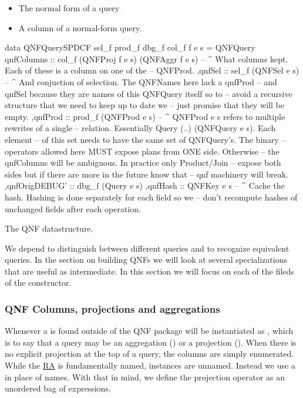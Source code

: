 \begin{itemize}
\item The normal form of a query
\item A column of a normal-form query.
\end{itemize}

\begin{code}
  \begin{haskellcode}
    data QNFQuerySPDCF sel_f prod_f dbg_f col_f f e s =
      QNFQuery
      { qnfColumns :: col_f (QNFProj f e s) (QNFAggr f e s)
        -- ^ What columns kept. Each of these is a column on one of the
        -- QNFProd.
        ,qnfSel :: sel_f (QNFSel e s)
        -- ^ And conjuction of selection. The QNFNames here lack a qnfProd
        -- and qnfSel because they are names of this QNFQuery itself so to
        -- avoid a recursive structure that we need to keep up to date we
        -- just promise that they will be empty.
        ,qnfProd :: prod_f (QNFProd e s)
        -- ^ QNFProd e s refers to multiple rewrites of a single
        -- relation. Essentially {Query (..) (QNFQuery e s)}. Each element
        -- of this set needs to have the same set of QNFQuery's. The binary
        -- operators allowed here MUST expose plans from ONE side. Otherwise
        -- the qnfColumns will be ambiguous. In practice only Product/Join
        -- expose both sides but if there are more in the future know that
        -- qnf machinery will break.
        ,qnfOrigDEBUG' :: dbg_f (Query e s)
        ,qnfHash :: QNFKey e s
        -- ^ Cache the hash. Hashing is done separately for each field so we
        -- don't recompute hashes of unchanged fields after each operation.
      }
  \end{haskellcode}
  \label{lst:qnf_struct}
  \caption{The QNF datastructure.}
\end{code}

We depend to distinguish between different queries and to recognize
equivalent queries. In the section on building QNFs we will look at
several specializations that are useful as intermediate. In this
section we will focus on each of the fileds of the 
constructor.

\subsubsection{QNF Columns, projections and aggregations}

Whenever a  is found outside of the QNF package
 will be instantiated as , which is to say
that a query may be an aggregation () or a projection
(). When there is no explicit projection at the top of a
query, the columns are simply enumerated. While the
\hyperref[sec:relational_algebra_semantics]{RA} is fundamentally
named,  instances are unnamed. Instead we use a
 in place of names. With that in mind, we define the
projection operator as an unordered bag of expressions.


